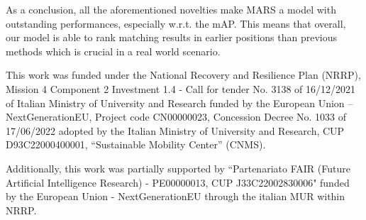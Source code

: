 \documentclass[acmsmall]{acmart}
\begin{document}
As a conclusion, all the aforementioned novelties make MARS a model with outstanding performances, especially w.r.t. the mAP. This means that overall, our model is able to rank matching results in earlier positions than previous methods which is crucial in a real world scenario.


\begin{acks}
This work was funded under the National Recovery and Resilience Plan (NRRP), Mission 4 Component 2 Investment 1.4 - Call for tender No. 3138 of 16/12/2021 of Italian Ministry of University and Research funded by the European Union – NextGenerationEU, Project code CN00000023, Concession Decree No. 1033 of 17/06/2022 adopted by the Italian Ministry of University and Research, CUP D93C22000400001, “Sustainable Mobility Center” (CNMS).

Additionally, this work was partially supported by ``Partenariato FAIR (Future Artificial Intelligence Research) - PE00000013, CUP J33C22002830006" funded by the European Union - NextGenerationEU through the italian MUR within NRRP.
\end{acks}







\end{document}
